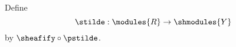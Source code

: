 \begin{definition}
Define
\[\stilde: \modules{R} \rightarrow \shmodules{Y}\]
by
$\sheafify \circ \pstilde$.
\end{definition}